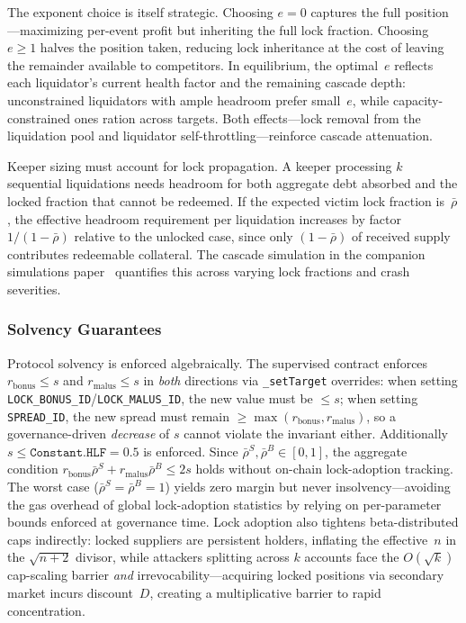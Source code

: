 \documentclass[10pt,a4paper,twocolumn]{article}
\begin{document}
The exponent choice is itself strategic. Choosing $e = 0$ captures the full position---maximizing per-event profit but inheriting the full lock fraction. Choosing $e \geq 1$ halves the position taken, reducing lock inheritance at the cost of leaving the remainder available to competitors. In equilibrium, the optimal~$e$ reflects each liquidator's current health factor and the remaining cascade depth: unconstrained liquidators with ample headroom prefer small~$e$, while capacity-constrained ones ration across targets. Both effects---lock removal from the liquidation pool and liquidator self-throttling---reinforce cascade attenuation.

Keeper sizing must account for lock propagation. A keeper processing $k$ sequential liquidations needs headroom for both aggregate debt absorbed and the locked fraction that cannot be redeemed. If the expected victim lock fraction is~$\bar{\rho}$, the effective headroom requirement per liquidation increases by factor $1/(1{-}\bar{\rho})$ relative to the unlocked case, since only $(1{-}\bar{\rho})$ of received supply contributes redeemable collateral. The cascade simulation in the companion simulations paper~\cite{sim} quantifies this across varying lock fractions and crash severities.

\subsubsection{Solvency Guarantees}

Protocol solvency is enforced algebraically. The supervised contract enforces $r_{\text{bonus}} \leq s$ and $r_{\text{malus}} \leq s$ in \emph{both} directions via \texttt{\_setTarget} overrides: when setting \texttt{LOCK\_BONUS\_ID}/\texttt{LOCK\_MALUS\_ID}, the new value must be $\leq s$; when setting \texttt{SPREAD\_ID}, the new spread must remain $\geq \max(r_{\text{bonus}}, r_{\text{malus}})$, so a governance-driven \emph{decrease} of $s$ cannot violate the invariant either. Additionally $s \leq \texttt{Constant.HLF} = 0.5$ is enforced. Since $\bar{\rho}^S, \bar{\rho}^B \in [0,1]$, the aggregate condition $r_{\text{bonus}} \bar{\rho}^S + r_{\text{malus}} \bar{\rho}^B \leq 2s$ holds without on-chain lock-adoption tracking. The worst case ($\bar{\rho}^S = \bar{\rho}^B = 1$) yields zero margin but never insolvency---avoiding the gas overhead of global lock-adoption statistics by relying on per-parameter bounds enforced at governance time. Lock adoption also tightens beta-distributed caps indirectly: locked suppliers are persistent holders, inflating the effective~$n$ in the $\sqrt{n{+}2}$ divisor, while attackers splitting across $k$ accounts face the $O(\sqrt{k})$ cap-scaling barrier \emph{and} irrevocability---acquiring locked positions via secondary market incurs discount~$D$, creating a multiplicative barrier to rapid concentration.
\end{document}
